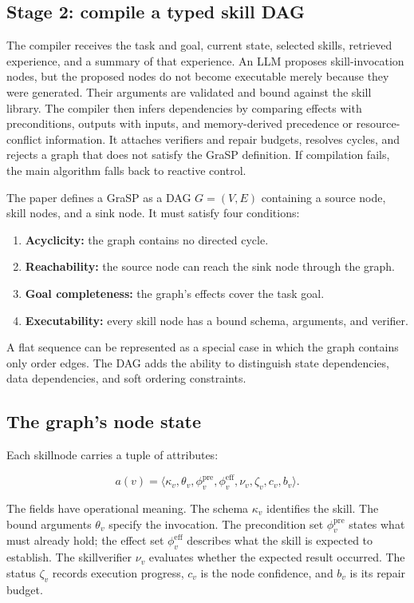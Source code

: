 \subsection{Stage 2: compile a typed skill DAG}

The compiler receives the task and goal, current state, selected skills, retrieved experience, and a summary of that experience. An LLM proposes skill-invocation nodes, but the proposed nodes do not become executable merely because they were generated. Their arguments are validated and bound against the skill library. The compiler then infers dependencies by comparing effects with preconditions, outputs with inputs, and memory-derived precedence or resource-conflict information. It attaches verifiers and repair budgets, resolves cycles, and rejects a graph that does not satisfy the GraSP definition. If compilation fails, the main algorithm falls back to reactive control.\autocite{xia2026grasp}

The paper defines a GraSP as a DAG \(G=(V,E)\) containing a source node, skill nodes, and a sink node. It must satisfy four conditions:

\begin{enumerate}
  \item \textbf{Acyclicity:} the graph contains no directed cycle.
  \item \textbf{Reachability:} the source node can reach the sink node through the graph.
  \item \textbf{Goal completeness:} the graph's effects cover the task goal.
  \item \textbf{Executability:} every skill node has a bound schema, arguments, and verifier.
\end{enumerate}

A flat sequence can be represented as a special case in which the graph contains only order edges. The DAG adds the ability to distinguish state dependencies, data dependencies, and soft ordering constraints.\autocite{xia2026grasp}

\subsection{The graph's node state}

Each \gls{skillnode} carries a tuple of attributes:

\[
 a(v)=\langle\kappa_v,\theta_v,\phi_v^{\mathrm{pre}},
 \phi_v^{\mathrm{eff}},\nu_v,\zeta_v,c_v,b_v\rangle.
\]

The fields have operational meaning. The schema \(\kappa_v\) identifies the skill. The bound arguments \(\theta_v\) specify the invocation. The precondition set \(\phi_v^{\mathrm{pre}}\) states what must already hold; the effect set \(\phi_v^{\mathrm{eff}}\) describes what the skill is expected to establish. The \gls{skillverifier} \(\nu_v\) evaluates whether the expected result occurred. The status \(\zeta_v\) records execution progress, \(c_v\) is the node confidence, and \(b_v\) is its repair budget.\autocite{xia2026grasp}

